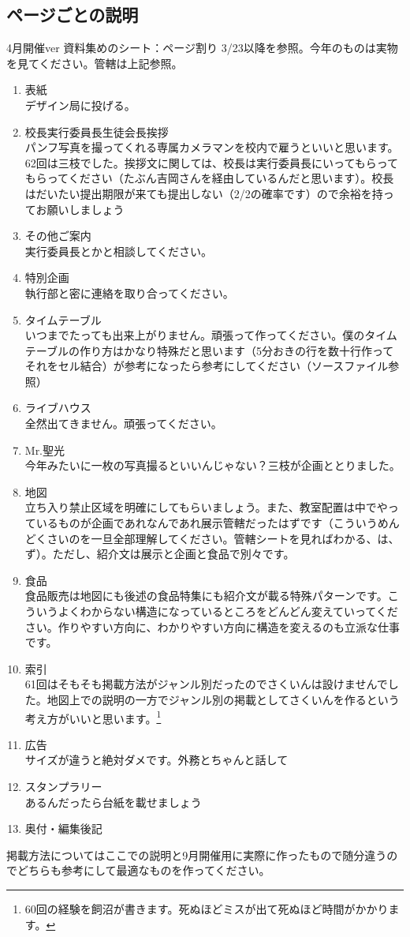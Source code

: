 \documentclass[dvipdfmx,jb5]{jarticle}
\begin{document}
\subsection{ページごとの説明}
4月開催ver 資料集めのシート：ページ割り 3/23以降を参照。今年のものは実物を見てください。管轄は上記参照。
\begin{enumerate}
  \item 表紙\\デザイン局に投げる。
  \item 校長実行委員長生徒会長挨拶\\パンフ写真を撮ってくれる専属カメラマンを校内で雇うといいと思います。62回は三枝でした。挨拶文に関しては、校長は実行委員長にいってもらってもらってください（たぶん吉岡さんを経由しているんだと思います）。校長はだいたい提出期限が来ても提出しない（2/2の確率です）ので余裕を持ってお願いしましょう
  \item その他ご案内\\実行委員長とかと相談してください。
  \item 特別企画\\執行部と密に連絡を取り合ってください。
  \item タイムテーブル\\いつまでたっても出来上がりません。頑張って作ってください。僕のタイムテーブルの作り方はかなり特殊だと思います（5分おきの行を数十行作ってそれをセル結合）が参考になったら参考にしてください（ソースファイル参照）
  \item ライブハウス\\全然出てきません。頑張ってください。
  \item Mr.聖光\\今年みたいに一枚の写真撮るといいんじゃない？三枝が企画ととりました。
  \item 地図\\立ち入り禁止区域を明確にしてもらいましょう。また、教室配置は中でやっているものが企画であれなんであれ展示管轄だったはずです（こういうめんどくさいのを一旦全部理解してください。管轄シートを見ればわかる、は、ず）。ただし、紹介文は展示と企画と食品で別々です。
  \item 食品\\食品販売は地図にも後述の食品特集にも紹介文が載る特殊パターンです。こういうよくわからない構造になっているところをどんどん変えていってください。作りやすい方向に、わかりやすい方向に構造を変えるのも立派な仕事です。
  \item 索引\\61回はそもそも掲載方法がジャンル別だったのでさくいんは設けませんでした。地図上での説明の一方でジャンル別の掲載としてさくいんを作るという考え方がいいと思います。\footnote{60回の経験を飼沼が書きます。死ぬほどミスが出て死ぬほど時間がかかります。}
  \item 広告\\サイズが違うと絶対ダメです。外務とちゃんと話して
  \item スタンプラリー\\あるんだったら台紙を載せましょう
  \item 奥付・編集後記
\end{enumerate}
掲載方法についてはここでの説明と9月開催用に実際に作ったもので随分違うのでどちらも参考にして最適なものを作ってください。
\end{document}
